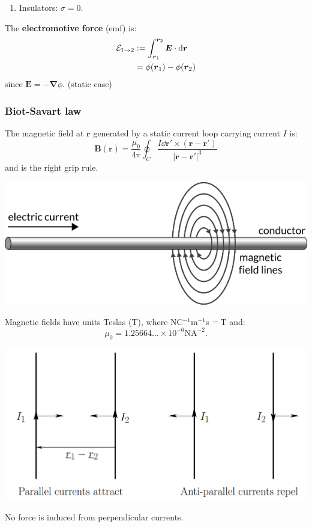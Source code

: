 \documentclass{article}
\newcommand{\deq}{\vcentcolon=}
\newcommand{\vc}[1]{\boldsymbol{#1}}
\begin{document}
\begin{multicols*}{3}
\begin{enumerate}
    \item Insulators: $\sigma=0$.
\end{enumerate}
The \textbf{electromotive force} (emf) is:
\begin{align*}
    \mathcal{E}_{1\rightarrow2}
    &\deq\int_{\vc{r}_1}^{\vc{r}_2}\vc{E}\cdot\dd\vc{r} \\
    &=\phi(\vc{r}_1)-\phi(\vc{r}_2)
\end{align*}
since $\vc{E}=-\vc{\nabla}\phi$. (static case)

\subsubsection*{Biot-Savart law}
The magnetic field at $\vc{r}$ generated by a static
current loop carrying current $I$ is:
$$\vc{B}(\vc{r})=\frac{\mu_0}{4\pi}\oint_C
\frac{I\dd\vc{r}'\times(\vc{r}-\vc{r}')}{|\vc{r}-\vc{r}'|^3}$$
and is the right grip rule.
\begin{center}
    \includegraphics[scale=0.2]{f05.png}
\end{center}
Magnetic fields have units Teslas (T),
where NC$^{-1}$m$^{-1}$s
$\hspace{0.00000001in}=\hspace{0.02in}$T and:
$$\mu_0=1.25664\dots\times10^{-6}\text{N}\text{A}^{-2}.$$
\begin{center}
    \includegraphics[scale=0.2]{f06.png}
\end{center}
No force is induced from perpendicular currents.


\end{multicols*}
\end{document}
